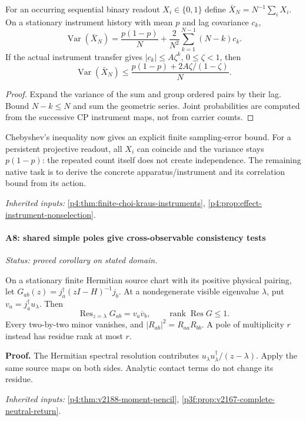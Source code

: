 \documentclass[12pt,a4paper]{article}
\begin{document}
For an occurring sequential binary readout $X_i\in\{0,1\}$ define
$\bar X_N=N^{-1}\sum_iX_i$. On a stationary instrument history with
mean $p$ and lag covariance $c_k$,
\[
 \operatorname{Var}(\bar X_N)=\frac{p(1-p)}N
 +\frac2{N^2}\sum_{k=1}^{N-1}(N-k)c_k.
\]
If the actual instrument transfer gives $|c_k|\le A\zeta^k$,
$0\le\zeta<1$, then
\[
 \operatorname{Var}(\bar X_N)\le
 \frac{p(1-p)+2A\zeta/(1-\zeta)}N.
\]
\begin{proof}
Expand the variance of the sum and group ordered pairs by their
lag. Bound $N-k\le N$ and sum the geometric series. Joint probabilities are
computed from the successive CP instrument maps, not from carrier counts.
\end{proof}
Chebyshev's inequality now gives an explicit finite sampling-error bound.
For a persistent projective readout, all $X_i$ can coincide and the variance
stays $p(1-p)$: the repeated count itself does not create independence.
The remaining native task is to derive the concrete apparatus/instrument
and its correlation bound from its action. \par\noindent\textit{Inherited inputs:} \ref{p4:thm:finite-choi-kraus-instruments}, \ref{p4:prop:effect-instrument-nonselection}.



\paragraph{A8: shared simple poles give cross-observable consistency tests}
\label{p4:sec:v2201-derived-a8}
\noindent\textit{Status: proved corollary on stated domain.}

On a stationary finite Hermitian source chart with its positive physical
pairing, let
\(G_{ab}(z)=j_a^\dagger(zI-H)^{-1}j_b\). At a nondegenerate visible
eigenvalue \(\lambda\), put \(v_a=j_a^\dagger u_\lambda\). Then
\[
\boxed{\operatorname{Res}_{z=\lambda}G_{ab}=v_a\overline v_b,\qquad
\operatorname{rank}\operatorname{Res}G\le1.}
\]
Every two-by-two minor vanishes, and
\(|R_{ab}|^2=R_{aa}R_{bb}\). A pole of multiplicity \(r\) instead has
residue rank at most \(r\).

\textbf{Proof.} The Hermitian spectral resolution contributes
\(u_\lambda u_\lambda^\dagger/(z-\lambda)\). Apply the same source maps
on both sides. Analytic contact terms do not change its residue.
\par\noindent\textit{Inherited inputs:} \ref{p4:thm:v2188-moment-pencil}, \ref{p3f:prop:v2167-complete-neutral-return}.
\end{document}
